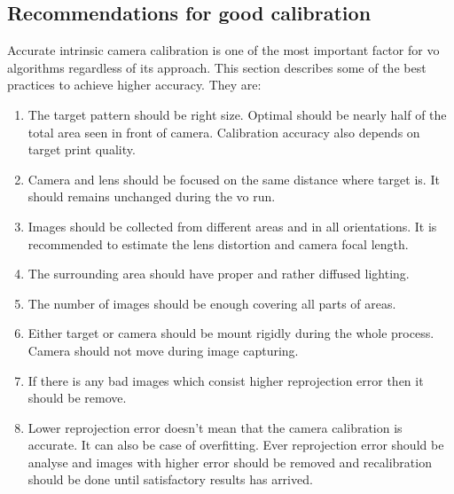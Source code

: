 \subsection{Recommendations for good calibration}
Accurate intrinsic camera calibration is one of the most important factor for \acrshort{vo} algorithms regardless of its approach. This section describes some of the best practices to achieve higher accuracy. They are:
\begin{enumerate}
	\item The target pattern should be right size. Optimal should be nearly half of the total area seen in front of camera. Calibration accuracy also depends on target print quality.
	\item Camera and lens should be focused on the same distance where target is. It should remains unchanged during the \acrshort{vo} run. 
	\item Images should be collected from different areas and in all orientations. It is recommended to estimate the lens distortion and camera focal length.
	\item The surrounding area should have proper and rather diffused lighting. 
	\item The number of images should be enough covering all parts of areas.
	\item Either target or camera should be mount rigidly during the whole process. Camera should not move during image capturing.
	\item If there is any bad images which consist higher reprojection error then it should be remove.
	\item Lower reprojection error doesn't mean that the camera calibration is accurate. It can also be case of overfitting. Ever reprojection error should be analyse and images with higher error should be removed and recalibration should be done until satisfactory results has arrived.
\end{enumerate}

